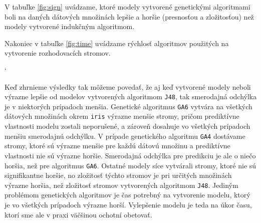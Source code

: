 V tabuľke \ref{fig:sign} uvádzame, ktoré modely vytvorené genetickými algoritmami boli na daných dátových množinách lepšie a horšie (presnosťou a zložitosťou) než modely vytvorené indukčným algoritmom.

Nakoniec v tabuľke \ref{fig:time} uvádzame rýchlosť algoritmov použitých na vytvorenie rozhodovacích stromov.

\begin{table}[h]
\catcode`
\centering
{}
\caption{Tabuľka, v ktorej popisujeme, ktoré výsledky boli signifikantne lepšie od tých získaných algoritmom \texttt{J48}. }\label{fig:sign}
\end{table}

Keď zhrnieme výsledky tak môžeme povedať, že aj keď vytvorené modely neboli výrazne lepšie od modelov vytvorených algoritmom \verb|J48|, tak smerodajná odchýlka je v niektorých prípadoch menšia.
Genetické algoritmus \verb|GA6| vytvára na všetkých dátových množinách okrem \verb|iris| výrazne menšie stromy, pričom prediktívne vlastnosti modelu zostali neporušené, a zároveň dosahuje vo všetkých prípadoch menšiu smerodajnú odchýlku. V prípade genetického algoritmu \verb|GA4| dostávame stromy, ktoré sú výrazne menšie pre každú dátovú množinu a prediktívne vlastnosti nie sú výrazne horšie. Smerodajná odchýlka pre predikciu je ale o niečo horšia, než pre algoritmus \verb|GA6|.
Ostatné modely síce vytvárali stromy, ktoré nie sú signifikantne horšie, no zložitosť týchto stromov je pri určitých množinách výrazne horšia, než zložitosť stromov vytvorených algoritmom \verb|J48|.
Jediným problémom genetických algoritmov je čas potrebný na vytvorenie modelu, ktorý je vo všetkých prípadoch výrazne horší. Vylepšenie modelu je teda na úkor času, ktorí sme ale v praxi väčšinou ochotní obetovať.



